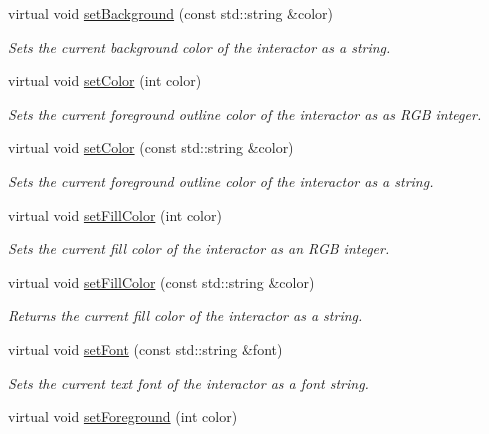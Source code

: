 \begin{DoxyCompactItemize}
virtual void \mbox{\hyperlink{classGDrawingSurface_ab4677ab2474e68b07aa56605af92a84a}{set\+Background}} (const std\+::string \&color)
\begin{DoxyCompactList}\small\item\em Sets the current background color of the interactor as a string. \end{DoxyCompactList}\item 
virtual void \mbox{\hyperlink{classGDrawingSurface_a75b9cb32ff80bf061791beb01a8433d0}{set\+Color}} (int color)
\begin{DoxyCompactList}\small\item\em Sets the current foreground outline color of the interactor as as R\+GB integer. \end{DoxyCompactList}\item 
virtual void \mbox{\hyperlink{classGDrawingSurface_a61374df6c11b52cfbb0815decdbaebc6}{set\+Color}} (const std\+::string \&color)
\begin{DoxyCompactList}\small\item\em Sets the current foreground outline color of the interactor as a string. \end{DoxyCompactList}\item 
virtual void \mbox{\hyperlink{classGDrawingSurface_a47fad447b715f2f303538434eed26709}{set\+Fill\+Color}} (int color)
\begin{DoxyCompactList}\small\item\em Sets the current fill color of the interactor as an R\+GB integer. \end{DoxyCompactList}\item 
virtual void \mbox{\hyperlink{classGDrawingSurface_adbc18b1a930aadd97d7437f9f7265b96}{set\+Fill\+Color}} (const std\+::string \&color)
\begin{DoxyCompactList}\small\item\em Returns the current fill color of the interactor as a string. \end{DoxyCompactList}\item 
virtual void \mbox{\hyperlink{classGDrawingSurface_a8e096e8818d838aceae1d46d58fb3a7b}{set\+Font}} (const std\+::string \&font)
\begin{DoxyCompactList}\small\item\em Sets the current text font of the interactor as a font string. \end{DoxyCompactList}\item 
virtual void \mbox{\hyperlink{classGDrawingSurface_a7daa57084b5811b598fce8726660b328}{set\+Foreground}} (int color)

\end{DoxyCompactItemize}
